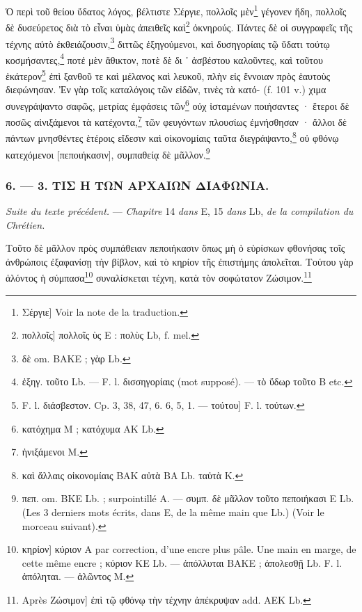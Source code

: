 \documentclass[a4paper, 11pt, oneside, polutonikogreek, french]{article}
\begin{document}
\bigskip

Ὁ περὶ τοῦ θείου ὕδατος λόγος, βέλτιστε Σέργιε, πολλοῖς μὲν\footnote{Σέργιε] Voir la note de la traduction.} γέγονεν ἤδη, πολλοῖς δὲ δυσεύρετος διὰ τὸ εἶναι ὑμὰς ἀπειθεῖς καὶ\footnote{πολλοῖς] πολλοῖς ὺς E : πολὺς Lb, f. mel.} ὀκνηρούς. Πάντες δὲ οἱ συγγραφεῖς τῆς τέχνης αὐτὸ ἐκθειάζουσιν,\footnote{δὲ om. BAKE ; γὰρ Lb.} διττῶς ἐξηγούμενοι, καὶ δυσηγορίαις τῷ ὕδατι τούτῳ κοσμήσαντες,\footnote{ἐξηγ. τοῦτο Lb. --- F. l. δισσηγορίαις (mot supposé). --- τὸ ὕδωρ τοῦτο B etc.} ποτἐ μὲν ἄθικτον, ποτὲ δὲ δι ᾽ ἀσβέστου καλοῦντες, καὶ τοῦτου ἑκάτερον\footnote{F. l. διάσβεστον. Cp. 3, 38, 47, 6. 6, 5, 1. --- τούτου] F. l. τούτων.} ἐπὶ ξανθοῦ τε καὶ μέλανος καὶ λευκοῦ, πλὴν εἰς ἔννοιαν πρὸς ἑαυτοὺς διεφώνησαν. Ἐν γὰρ τοῖς καταλόγοις τῶν εἰδῶν, τινὲς τὰ κατό- (f. 101 v.) χιμα συνεγράψαντο σαφῶς, μετρίας ἐμφάσεις τῶν\footnote{κατόχημα M ; κατόχυμα AK Lb.} οὐχ ἱσταμένων ποιήσαντες · ἕτεροι δὲ ποσῶς αἰνιξάμενοι τὰ κατέχοντα,\footnote{ἠνιξάμενοι M.} τῶν φευγόντων πλουσίως ἐμνήσθησαν · ἄλλοι δὲ πάντων μνησθέντες ἑτέροις εἴδεσιν καὶ οἰκονομίαις ταῦτα διεγράψαντο,\footnote{καὶ ἄλλαις οἰκονομίαις BAK αὐτὰ BA Lb. ταὐτὰ K.} οὐ φθόνῳ κατεχόμενοι [πεποιήκασιν], συμπαθείᾳ δὲ μᾶλλον.\footnote{πεπ. om. BKE Lb. ; surpointillé A. --- συμπ. δὲ μᾶλλον τοῦτο πεποιήκασι E Lb. (Les 3 derniers mots écrits, dans E, de la même main que Lb.) (Voir le morceau suivant).}

\bigskip
\centerline{\EightStarTaper}
\centerline{\EightStarTaper\EightStarTaper}
\bigskip

\subsubsection{6. --- 3. ΤΙΣ Η ΤΩΝ ΑΡΧΑΙΩΝ ΔΙΑΦΩΝΙΑ.}

\emph{Suite du texte précédent.} --- \emph{Chapitre} 14 \emph{dans} E, 15 \emph{dans} Lb, \emph{de la compilation du Chrétien.}

\bigskip

Τοῦτο δὲ μᾶλλον πρὸς συμπάθειαν πεποιήκασιν ὅπως μὴ ὁ εὑρίσκων φθονήσας τοῖς ἀνθρώποις ἐξαφανίσῃ τὴν βίβλον, καὶ τὸ κηρίον τῆς ἐπιστήμης ἀπολεῖται. Τούτου γὰρ ἁλόντος ἡ σύμπασα\footnote{κηρίον] κύριον A par correction, d'une encre plus pâle. Une main en marge, de cette même encre ; κύριον KE Lb. --- ἀπόλλυται BAKE ; ἀπολεσθῇ Lb. F. l. ἀπόληται. --- ἀλῶντος M.} συναλίσκεται τέχνη, κατὰ τὸν σοφώτατον Ζώσιμον.\footnote{Après Ζώσιμον] ἐπὶ τῷ φθόνῳ τὴν τέχνην ἀπέκρυψαν add. AEK Lb.}
\end{document}
